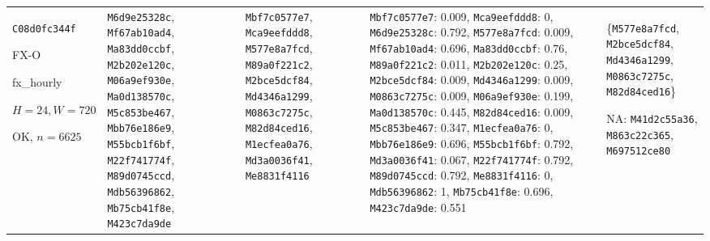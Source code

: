 \begin{longtable}{p{.15\linewidth}p{.17\linewidth}p{.17\linewidth}p{.25\linewidth}p{.14\linewidth}}
\texttt{C08d0fc344f}\par FX-O\par fx\_\allowbreak{}hourly\par $H=24,W=720$\par OK, $n=6625$ & \texttt{M6d9e25328c}, \texttt{Mf67ab10ad4}, \texttt{Ma83dd0ccbf}, \texttt{M2b202e120c}, \texttt{M06a9ef930e}, \texttt{Ma0d138570c}, \texttt{M5c853be467}, \texttt{Mbb76e186e9}, \texttt{M55bcb1f6bf}, \texttt{M22f741774f}, \texttt{M89d0745ccd}, \texttt{Mdb56396862}, \texttt{Mb75cb41f8e}, \texttt{M423c7da9de} & \texttt{Mbf7c0577e7}, \texttt{Mca9eefddd8}, \texttt{M577e8a7fcd}, \texttt{M89a0f221c2}, \texttt{M2bce5dcf84}, \texttt{Md4346a1299}, \texttt{M0863c7275c}, \texttt{M82d84ced16}, \texttt{M1ecfea0a76}, \texttt{Md3a0036f41}, \texttt{Me8831f4116} & \texttt{Mbf7c0577e7}: 0.009, \texttt{Mca9eefddd8}: 0, \texttt{M6d9e25328c}: 0.792, \texttt{M577e8a7fcd}: 0.009, \texttt{Mf67ab10ad4}: 0.696, \texttt{Ma83dd0ccbf}: 0.76, \texttt{M89a0f221c2}: 0.011, \texttt{M2b202e120c}: 0.25, \texttt{M2bce5dcf84}: 0.009, \texttt{Md4346a1299}: 0.009, \texttt{M0863c7275c}: 0.009, \texttt{M06a9ef930e}: 0.199, \texttt{Ma0d138570c}: 0.445, \texttt{M82d84ced16}: 0.009, \texttt{M5c853be467}: 0.347, \texttt{M1ecfea0a76}: 0, \texttt{Mbb76e186e9}: 0.696, \texttt{M55bcb1f6bf}: 0.792, \texttt{Md3a0036f41}: 0.067, \texttt{M22f741774f}: 0.792, \texttt{M89d0745ccd}: 0.792, \texttt{Me8831f4116}: 0, \texttt{Mdb56396862}: 1, \texttt{Mb75cb41f8e}: 0.696, \texttt{M423c7da9de}: 0.551 & \{\texttt{M577e8a7fcd}, \texttt{M2bce5dcf84}, \texttt{Md4346a1299}, \texttt{M0863c7275c}, \texttt{M82d84ced16}\}\par NA: \texttt{M41d2c55a36}, \texttt{M863c22c365}, \texttt{M697512ce80} \\

\end{longtable}
